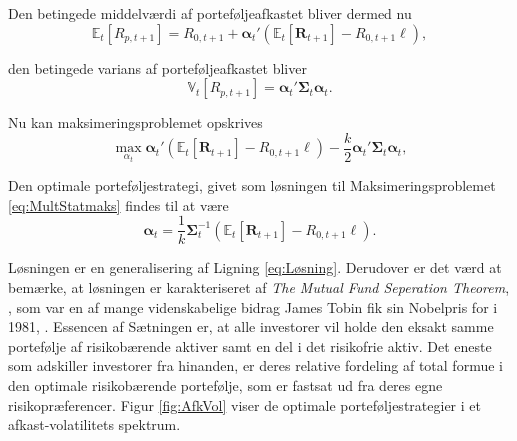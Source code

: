 \documentclass[
  a4paper,
  oneside]{memoir}
\begin{document}
Den betingede middelværdi af porteføljeafkastet bliver dermed nu
\begin{equation}
\mathbb{E}_t\left[R_{p,t+1}\right]=R_{0,t+1}+\bm{\alpha}_t'(\mathbb{E}_t\left[\bm{R}_{t+1}\right]- R_{0,t+1}\bm{\ell}),
\end{equation}

den betingede varians af porteføljeafkastet bliver
\begin{equation}
\mathbb{V}_t\left[R_{p,t+1}\right]=\bm{\alpha}_t'\bm{\Sigma}_t\bm{\alpha}_t.
\end{equation}

Nu kan maksimeringsproblemet opskrives
\begin{equation}
\max_{\alpha_t} \bm{\alpha}_t'(\mathbb{E}_t\left[\bm{R}_{t+1}\right]- R_{0,t+1}\bm{\ell}) - \frac{k}{2}\bm{\alpha}_t'\bm{\Sigma}_t\bm{\alpha}_t, \label{eq:MultStatmaks}
\end{equation}

Den optimale porteføljestrategi, givet som løsningen til Maksimeringsproblemet \eqref{eq:MultStatmaks} findes til at være
\begin{equation}
\bm{\alpha}_t=\frac{1}{k}\bm{\Sigma}_t^{-1}(\mathbb{E}_t\left[\bm{R}_{t+1}\right]-R_{0,t+1}\bm{\ell}).\label{eq:Multalpha}
\end{equation}

Løsningen er en generalisering af Ligning \eqref{eq:Løsning}. Derudover er det værd at bemærke, at løsningen er karakteriseret af \textit{The Mutual Fund Seperation Theorem}, \citep{Tobin1958}, som var en af mange videnskabelige bidrag James Tobin fik sin Nobelpris for i 1981, \citep{Nobel2020}. Essencen af Sætningen er, at alle investorer vil holde den eksakt samme portefølje af risikobærende aktiver samt en del i det risikofrie aktiv. Det eneste som adskiller investorer fra hinanden, er deres relative fordeling af total formue i den optimale risikobærende portefølje, som er fastsat ud fra deres egne risikopræferencer. Figur \ref{fig:AfkVol} viser de optimale porteføljestrategier i et afkast-volatilitets spektrum.
\end{document}
